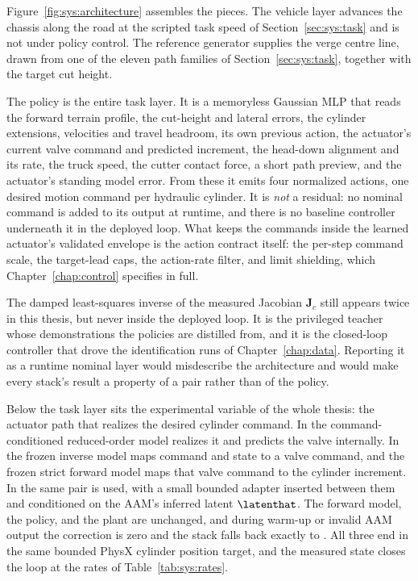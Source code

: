 Figure~\ref{fig:sys:architecture} assembles the pieces. The vehicle
layer advances the chassis along the road at the scripted task speed of
Section~\ref{sec:sys:task} and is not under policy control. The reference generator supplies the verge centre
line, drawn from one of the eleven path families of
Section~\ref{sec:sys:task}, together with the target cut height.

The policy is the entire task layer. It is a memoryless Gaussian MLP
that reads the forward terrain profile, the cut-height and lateral
errors, the cylinder extensions, velocities and travel headroom, its own
previous action, the actuator's current valve command and predicted
increment, the head-down alignment and its rate, the truck speed, the
cutter contact force, a short path preview, and the actuator's standing
model error. From these it emits four normalized actions, one desired
motion command per hydraulic cylinder. It is \emph{not} a residual: no
nominal command is added to its output at runtime, and there is no
baseline controller underneath it in the deployed loop. What keeps the
commands inside the learned actuator's validated envelope is the action contract itself:
the per-step command scale, the target-lead caps, the action-rate filter,
and limit shielding, which Chapter~\ref{chap:control} specifies in full.

The damped least-squares inverse of the measured Jacobian $\bm{J}_c$
still appears twice in this thesis, but never inside the deployed loop.
It is the privileged teacher whose demonstrations the policies are
distilled from, and it is the closed-loop controller that drove the
identification runs of Chapter~\ref{chap:data}. Reporting it as a
runtime nominal layer would misdescribe the architecture and would make
every stack's result a property of a pair rather than of the policy.

Below the task layer sits the experimental variable of the whole thesis:
the actuator path that realizes the desired cylinder command. In
\ppoROM{} the command-conditioned reduced-order model realizes it and
predicts the valve internally. In \ppoIDFD{} the frozen inverse model
maps command and state to a valve command, and the frozen strict forward
model maps that valve command to the cylinder increment. In
\ppoIDAAMFD{} the same pair is used, with a small bounded adapter
inserted between them and conditioned on the AAM's inferred latent
$\latenthat$. The forward model, the policy, and the plant are
unchanged, and during warm-up or invalid AAM output the correction is
zero and the stack falls back exactly to \ppoIDFD. All three end in the
same bounded PhysX cylinder position target, and the measured state
closes the loop at the rates of Table~\ref{tab:sys:rates}.

